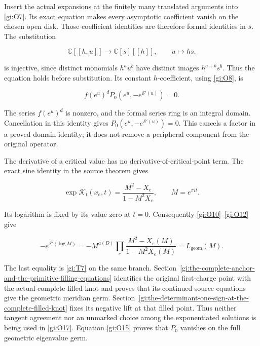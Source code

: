 Insert the actual expansions at the finitely many translated
arguments into \eqref{gi:O7}. Its exact equation makes every asymptotic
coefficient vanish on the chosen open disk. Those coefficient
identities are therefore formal identities in \(s\). The substitution

\begin{equation}\label{gi:O14}
\mathbb{C}[[h,u]]\longrightarrow\mathbb{C}[s][[h]],
                      \qquad u\mapsto hs.
\end{equation}

is injective, since distinct monomials \(h^au^b\) have distinct
images \(h^{a+b}s^b\). Thus the equation holds before substitution.
Its constant \(h\)-coefficient, using \eqref{gi:O8}, is

\begin{equation}\label{gi:O15}
f(e^u)^dP_0(e^u,-e^{\mathcal S'(u)})=0.
\end{equation}

The series \(f(e^u)^d\) is nonzero, and the formal series ring is
an integral domain. Cancellation in this identity gives
\(P_0(e^u,-e^{\mathcal S'(u)})=0\). This cancels a factor in
a proved domain identity; it does not remove a peripheral
component from the original operator.

The derivative of a critical value has no derivative-of-critical-point
term. The exact sine identity in the source theorem gives

\begin{equation}\label{gi:O16}
\exp\mathcal K_t(x_e,t)
       =\frac{M^2-X_e}{1-M^2X_e},\qquad M=e^{\pi it}.
\end{equation}

Its logarithm is fixed by its value zero at \(t=0\).
Consequently \eqref{gi:O10}--\eqref{gi:O12} give

\begin{equation}\label{gi:O17}
-e^{\mathcal S'(\log M)}
       =-M^{a(D)}
           \prod_e\frac{M^2-X_e(M)}{1-M^2X_e(M)}
       =L_{\mathrm{geom}}(M).
\end{equation}

The last equality is \eqref{gi:T7} on the same branch. Section~\ref{gi:the-complete-anchor-and-the-primitive-filling-equations} identifies
the original first-charge point with the actual complete filled
knot and proves that its continued source equations give the
geometric meridian germ. Section~\ref{gi:the-determinant-one-sign-at-the-complete-filled-knot} fixes its negative lift at
that filled point. Thus neither tangent agreement nor an unmarked
choice among the exponentiated solutions is being used in \eqref{gi:O17}.
Equation \eqref{gi:O15} proves that \(P_0\) vanishes on the full geometric
eigenvalue germ.

